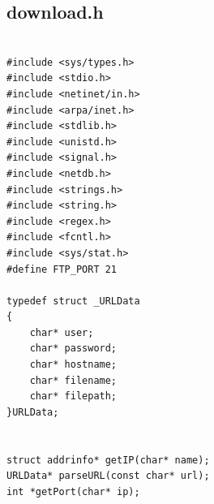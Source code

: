 \documentclass{article}
\begin{document}
\subsection{download.h}
\begin{lstlisting}

#include <sys/types.h>
#include <stdio.h>
#include <netinet/in.h>
#include <arpa/inet.h>
#include <stdlib.h>
#include <unistd.h>
#include <signal.h>
#include <netdb.h>
#include <strings.h>
#include <string.h>
#include <regex.h>
#include <fcntl.h>
#include <sys/stat.h>
#define FTP_PORT 21

typedef struct _URLData
{
	char* user; 
	char* password; 
	char* hostname; 
	char* filename; 
	char* filepath;
}URLData;


struct addrinfo* getIP(char* name);
URLData* parseURL(const char* url);
int *getPort(char* ip);





\end{lstlisting}
\end{document}
